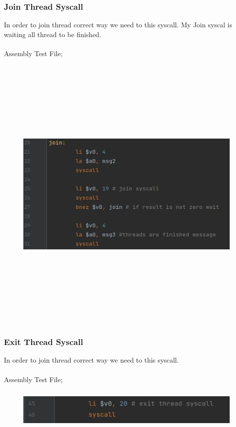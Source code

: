 \documentclass{article}
\begin{document}
\subsubsection{Join Thread Syscall}
In order to join thread correct way we need to this syscall. My Join syscal is waiting all thread to be finished.\\ \\
Assembly Test File;
\begin{figure}[H]
    \centering
	\includegraphics[width=5in, height=5.5in]{12.JPG}
	\caption[Optional caption]{}
	\label{}
\end{figure}
\subsubsection{Exit Thread Syscall}
In order to join thread correct way we need to this syscall. \\ \\
Assembly Test File;
\begin{figure}[H]
    \centering
	\includegraphics[width=6in, height=0.8in]{13.JPG}
	\caption[Optional caption]{}
	\label{}
\end{figure}       
\cleardoublepage                       
\end{document}
